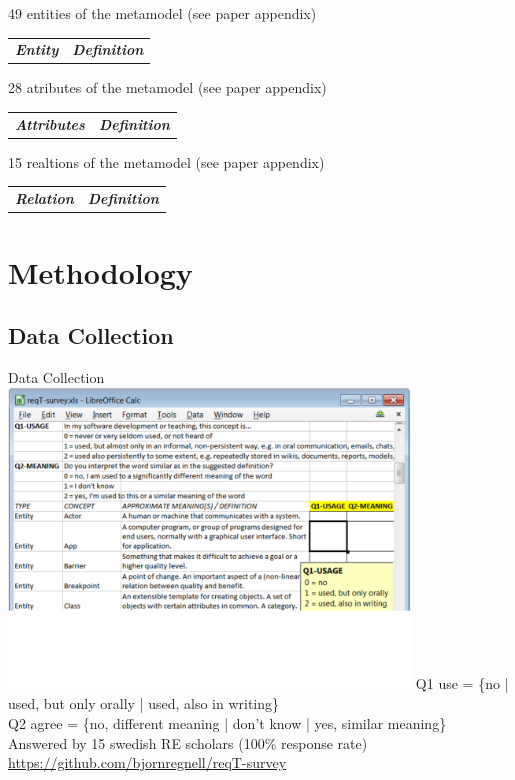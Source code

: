\documentclass{slides}
\begin{document}
\begin{Slide}{49 entities of the metamodel (see paper appendix)}
\fontsize{3.5}{4.0}\selectfont
\begin{tabular}{l l}
\textbf{\textit{Entity}} & \textbf{\textit{Definition}}  \\

\end{tabular}
\end{Slide}

\begin{Slide}{28 atributes of the metamodel (see paper appendix)}
\fontsize{6}{6.5}\selectfont
\begin{tabular}{l l}
\textbf{\textit{Attributes}} & \textbf{\textit{Definition}}  \\

\end{tabular}
\end{Slide}


\begin{Slide}{15 realtions of the metamodel (see paper appendix)}
\fontsize{8}{9}\selectfont
\begin{tabular}{l l}
\textbf{\textit{Relation}} & \textbf{\textit{Definition}}  \\

\end{tabular}
\end{Slide}



\section{Methodology}
\subsection{Data Collection}
\begin{Slide}{Data Collection}
{\centering
\includegraphics[width=0.8\textwidth]{img/survey-screen-dump}
}
{\small Q1 use =   \{no | used, but only orally | used, also in writing\}\\ Q2 agree = \{no, different meaning | don't know | yes, similar meaning\}  \\
Answered by 15 swedish RE scholars (100\% response rate)\\
\url{https://github.com/bjornregnell/reqT-survey}
}

\end{Slide}
\end{document}
